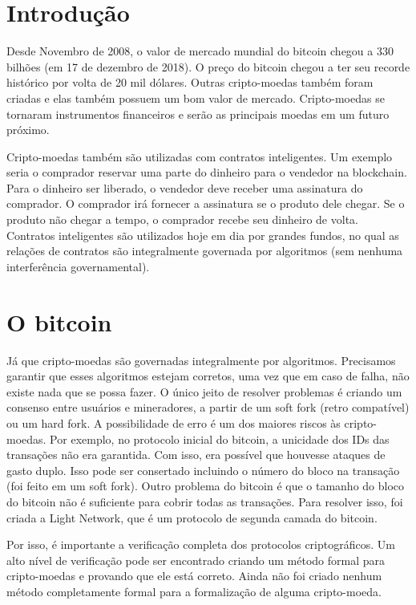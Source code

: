 \documentclass[12pt]{report}
\begin{document}
\tableofcontents
\pagebreak

\renewcommand{\thesection}{\arabic{section}}
\section{Introdução}

Desde Novembro de 2008, o valor de mercado mundial do bitcoin chegou a 330 bilhões (em 17 de dezembro de 2018). O preço do bitcoin chegou a ter seu recorde histórico por volta de 20 mil dólares. Outras cripto-moedas também foram criadas e elas também possuem um bom valor de mercado. Cripto-moedas se tornaram instrumentos financeiros e serão as principais moedas em um futuro próximo.

Cripto-moedas também são utilizadas com contratos inteligentes. Um exemplo seria o comprador reservar uma parte do dinheiro para o vendedor na blockchain. Para o dinheiro ser liberado, o vendedor deve receber uma assinatura do comprador. O comprador irá fornecer a assinatura se o produto dele chegar. Se o produto não chegar a tempo, o comprador recebe seu dinheiro de volta. Contratos inteligentes são utilizados hoje em dia por grandes fundos, no qual as relações de contratos são integralmente governada por algoritmos (sem nenhuma interferência governamental).

\section{O bitcoin}

Já que cripto-moedas são governadas integralmente por algoritmos.
Precisamos garantir que esses algoritmos estejam corretos, uma vez que em caso de falha,
não existe nada que se possa fazer.
O único jeito de resolver problemas é criando um consenso entre usuários e mineradores,
a partir de um soft fork (retro compatível) ou um hard fork.
A possibilidade de erro é um dos maiores riscos às cripto-moedas.
Por exemplo, no protocolo inicial do bitcoin, a unicidade dos IDs das transações não era garantida.
Com isso, era possível que houvesse ataques de gasto duplo.
Isso pode ser consertado incluindo o número do bloco na transação (foi feito em um soft fork).
Outro problema do bitcoin é que o tamanho do bloco do bitcoin não é suficiente para cobrir todas as transações.
Para resolver isso, foi criada a Light Network, que é um protocolo de segunda camada do bitcoin.

Por isso, é importante a verificação completa dos protocolos criptográficos.
Um alto nível de verificação pode ser encontrado criando um método formal para cripto-moedas e provando que ele está correto.
Ainda não foi criado nenhum método completamente formal para a formalização de alguma cripto-moeda.
\end{document}
